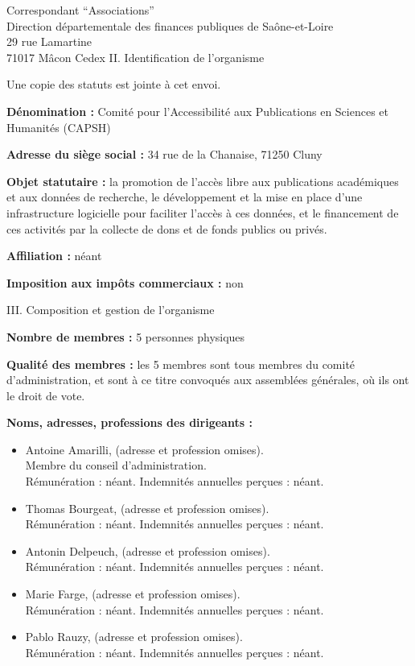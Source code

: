 \documentclass[11pt]{lettre}
\begin{document}
\begin{letter}{Correspondant ``Associations''\\Direction départementale des finances publiques de Saône-et-Loire\\29 rue Lamartine\\71017 Mâcon Cedex}
  \bigskip
  {\Large II. Identification de l'organisme}

  Une copie des statuts est jointe à cet envoi.

  \textbf{Dénomination :} Comité pour l'Accessibilité aux Publications en Sciences
  et Humanités (CAPSH)

  \textbf{Adresse du siège social :} 34 rue de la Chanaise, 71250 Cluny

  \textbf{Objet statutaire :} la promotion de l'accès libre aux publications académiques
  et aux données de recherche, le développement et la mise en place d'une
  infrastructure logicielle pour faciliter l'accès à ces données, et le
  financement de ces activités par la collecte de dons et de fonds publics ou
  privés.

  \textbf{Affiliation :} néant

  \textbf{Imposition aux impôts commerciaux :} non

  \bigskip
  {\Large III. Composition et gestion de l'organisme }

  \textbf{Nombre de membres :} 5 personnes physiques

  \textbf{Qualité des membres :} les 5 membres sont tous membres du comité
  d'administration, et sont à ce titre convoqués aux assemblées générales, où
  ils ont le droit de vote.

  \textbf{Noms, adresses, professions des dirigeants :}
  \begin{itemize}
    \item Antoine Amarilli, (adresse et profession omises).\\Membre du conseil
      d'administration.\\Rémunération : néant. Indemnités annuelles perçues : néant.
    \item Thomas Bourgeat, (adresse et profession omises).\\
      Rémunération : néant. Indemnités annuelles perçues : néant.
    \item Antonin Delpeuch, (adresse et profession omises).\\
      Rémunération : néant. Indemnités annuelles perçues : néant.
    \item Marie Farge, (adresse et profession omises).\\
      Rémunération : néant. Indemnités annuelles perçues : néant.
    \item Pablo Rauzy, (adresse et profession omises).\\
      Rémunération : néant. Indemnités annuelles perçues : néant.
  \end{itemize}
  

\end{letter}
\end{document}
